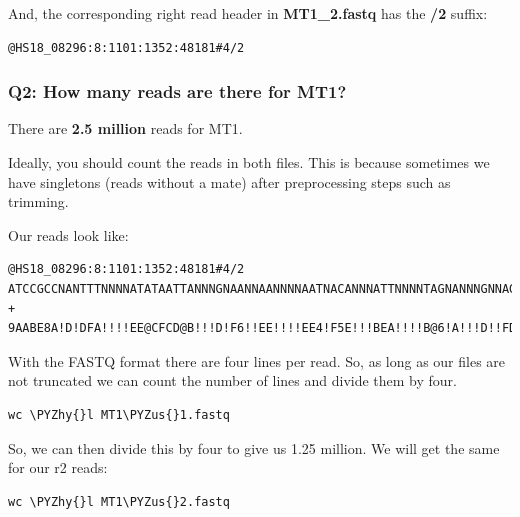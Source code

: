 \documentclass[11pt]{article}
\makeatletter
\def\PYZus{\char`\_}
\def\PYZhy{\char`\-}
\newcommand{\boxspacing}{\kern\kvtcb@left@rule\kern\kvtcb@boxsep}
\newcommand{\prompt}[4]{
        {\ttfamily\llap{{\color{#2}[#3]:\hspace{3pt}#4}}\vspace{-\baselineskip}}
    }
\makeatother
\begin{document}
And, the corresponding right read header in \textbf{MT1\_2.fastq} has
the \textbf{/2} suffix:

\begin{verbatim}
@HS18_08296:8:1101:1352:48181#4/2
\end{verbatim}

    \hypertarget{q2-how-many-reads-are-there-for-mt1}{%
\subsubsection{Q2: How many reads are there for
MT1?}\label{q2-how-many-reads-are-there-for-mt1}}

There are \textbf{2.5 million} reads for MT1.

Ideally, you should count the reads in both files. This is because
sometimes we have singletons (reads without a mate) after preprocessing
steps such as trimming.

Our reads look like:

\begin{verbatim}
@HS18_08296:8:1101:1352:48181#4/2
ATCCGCCNANTTTNNNNATATAATTANNNGNAANNAANNNNAATNACANNNATTNNNNTAGNANNNGNNAGTNNACAAGGNTNNNNNNNAAAGNNNNNNN
+
9AABE8A!D!DFA!!!!EE@CFCD@B!!!D!F6!!EE!!!!EE4!F5E!!!BEA!!!!B@6!A!!!D!!FD'!!C+D@@*!B!!!!!!!B>DE!!!!!!!
\end{verbatim}

With the FASTQ format there are four lines per read. So, as long as our
files are not truncated we can count the number of lines and divide them
by four.

    \begin{tcolorbox}[breakable, size=fbox, boxrule=1pt, pad at break*=1mm,colback=cellbackground, colframe=cellborder]
\prompt{In}{incolor}{ }{\boxspacing}
\begin{Verbatim}[commandchars=\\\{\}]
wc \PYZhy{}l MT1\PYZus{}1.fastq
\end{Verbatim}
\end{tcolorbox}

    So, we can then divide this by four to give us 1.25 million. We will get
the same for our r2 reads:

    \begin{tcolorbox}[breakable, size=fbox, boxrule=1pt, pad at break*=1mm,colback=cellbackground, colframe=cellborder]
\prompt{In}{incolor}{ }{\boxspacing}
\begin{Verbatim}[commandchars=\\\{\}]
wc \PYZhy{}l MT1\PYZus{}2.fastq
\end{Verbatim}
\end{tcolorbox}
\end{document}
